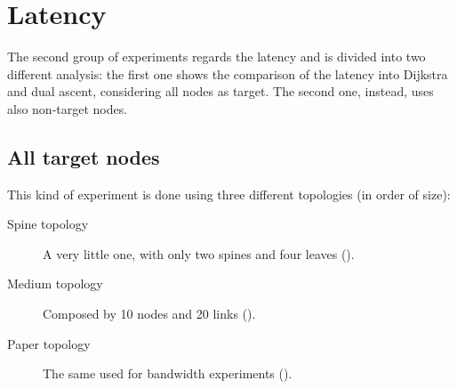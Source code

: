\section{Latency}\label{sec:latency}

The second group of experiments regards the latency and is divided into two
different analysis: the first one shows the comparison of the latency into
Dijkstra and dual ascent, considering all nodes as target. The second one,
instead, uses also non-target nodes.

\subsection{All target nodes}

This kind of experiment is done using three different topologies (in order of
size):
\begin{description}
	\item[Spine topology] A very little one, with only two spines and four
		leaves ().
	\item[Medium topology] Composed by 10 nodes and 20 links
		().
	\item [Paper topology] The same used for bandwidth experiments
		().
\end{description}

